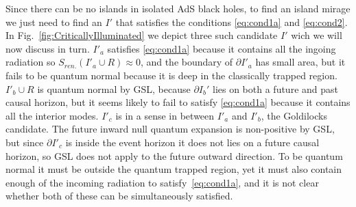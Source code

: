 \documentclass[a4paper,11pt]{article}
\newcommand{\del}{\partial}
\begin{document}
Since there can be no islands in isolated AdS black holes, to find an island mirage we just need to find an $I'$ that satisfies the conditions \eqref{eq:cond1a} and \eqref{eq:cond2}. In Fig.~\ref{fig:CriticallyIlluminated} we depict three such candidate $I'$ wich we will now discuss in turn. $I'_a$ satisfies \eqref{eq:cond1a} because it contains all the ingoing radiation so $S_{ren.}(I'_a \cup R) \approx 0$, and the boundary of $\del I'_a$ has small area, but it fails to be quantum normal because it is deep in the classically trapped region. $I'_b \cup R$ is quantum normal by GSL, because $\del I_b'$ lies on both a future and past causal horizon, but it seems likely to fail to satisfy \eqref{eq:cond1a} because it contains all the interior modes. 
$I'_c$ is in a sense in between $I'_a$ and $I'_b$, the Goldilocks candidate. The future inward null quantum expansion is non-positive by GSL, but since $\del I'_c$ is inside the event horizon it does not lies on a future causal horizon, so GSL does not apply to the future outward direction. To be quantum normal it must be outside the quantum trapped region, yet it must also contain enough of the incoming radiation to satisfy~\eqref{eq:cond1a}, and it is not clear whether both of these can be simultaneously satisfied.
\end{document}
